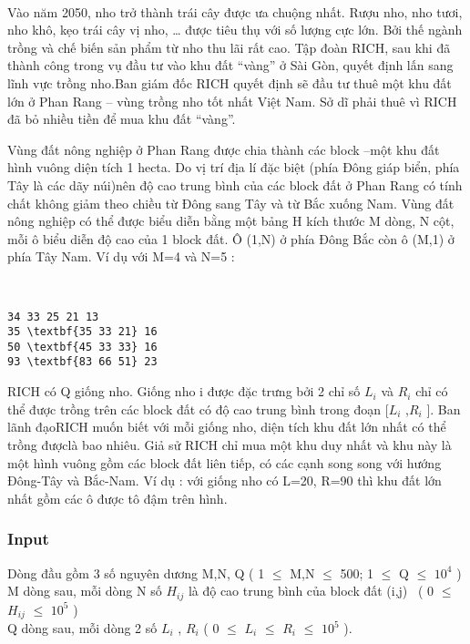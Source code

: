 

 

Vào năm 2050, nho trở thành trái cây được ưa chuộng nhất. Rượu nho, nho tươi, nho khô, kẹo trái cây vị nho, … được tiêu thụ với số lượng cực lớn. Bởi thế ngành trồng và chế biến sản phẩm từ nho thu lãi rất cao. Tập đoàn RICH, sau khi đã thành công trong vụ đầu tư vào khu đất “vàng” ở Sài Gòn, quyết định lấn sang lĩnh vực trồng nho.Ban giám đốc RICH quyết định sẽ đầu tư thuê một khu đất lớn ở Phan Rang – vùng trồng nho tốt nhất Việt Nam. Sở dĩ phải thuê vì RICH đã bỏ nhiều tiền để mua khu đất “vàng”.

Vùng đất nông nghiệp ở Phan Rang được chia thành các block –một khu đất hình vuông diện tích 1 hecta. Do vị trí địa lí đặc biệt (phía Đông giáp biển, phía Tây là các dãy núi)nên độ cao trung bình của các block đất ở Phan Rang có tính chất không giảm theo chiều từ Đông sang Tây và từ Bắc xuống Nam. Vùng đất nông nghiệp có thể được biểu diễn bằng một bảng H kích thước M dòng, N cột, mỗi ô biểu diễn độ cao của 1 block đất. Ô (1,N) ở phía Đông Bắc còn ô (M,1) ở phía Tây Nam. Ví dụ với M=4 và N=5 :

 
\begin{verbatim}
34 33 25 21 13
35 \textbf{35 33 21} 16
50 \textbf{45 33 33} 16
93 \textbf{83 66 51} 23

\end{verbatim}

RICH có Q giống nho. Giống nho i được đặc trưng bởi 2 chỉ số $L_{i}$ và $R_{i}$ chỉ có thể được trồng trên các block đất có độ cao trung bình trong đoạn [$L_{i}$ ,$R_{i}$ ]. Ban lãnh đạoRICH muốn biết với mỗi giống nho, diện tích khu đất lớn nhất có thể trồng đượclà bao nhiêu. Giả sử RICH chỉ mua một khu duy nhất và khu này là một hình vuông gồm các block đất liên tiếp, có các cạnh song song với hướng Đông-Tây và Bắc-Nam. Ví dụ : với giống nho có L=20, R=90 thì khu đất lớn nhất gồm các ô được tô đậm trên hình.

\subsubsection{Input}

Dòng đầu gồm 3 số nguyên dương M,N, Q ( 1  $\le$  M,N  $\le$  500; 1  $\le$  Q  $\le$  $10^{4}$ )
\\M dòng sau, mỗi dòng N số $H_{ij}$ là độ cao trung bình của block đất (i,j)  ( 0  $\le$  $H_{ij}$  $\le$  $10^{5}$ )
\\Q dòng sau, mỗi dòng 2 số $L_{i}$ , $R_{i}$ ( 0  $\le$  $L_{i}$  $\le$  $R_{i}$  $\le$  $10^{5}$ ).

